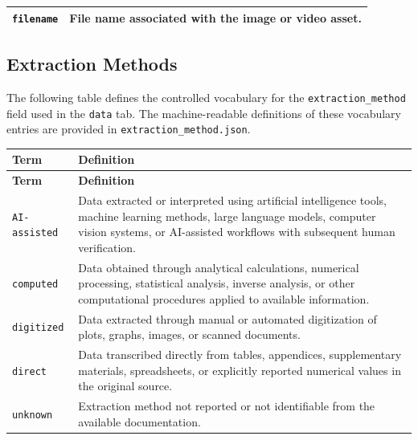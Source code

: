 \documentclass[11pt]{book}
\begin{document}
{\begin{longtable}{p{}p{}}
\texttt{filename} &
File name associated with the image or video asset. \\

\hline
\end{longtable}



\subsection{Extraction Methods}
\label{vocab:extraction_methods_list}

The following table defines the controlled vocabulary for the \texttt{extraction\_method} field used in the \texttt{data} tab. The machine-readable definitions of these vocabulary entries are provided in \texttt{extraction\_method.json}.

\begin{longtable}{p{}p{}}
\hline
\textbf{Term} & \textbf{Definition} \\
\hline
\endfirsthead

\hline
\textbf{Term} & \textbf{Definition} \\
\hline
\endhead

\texttt{AI-assisted} &
Data extracted or interpreted using artificial intelligence tools, machine learning methods, large language models, computer vision systems, or AI-assisted workflows with subsequent human verification. \\

\texttt{computed} &
Data obtained through analytical calculations, numerical processing, statistical analysis, inverse analysis, or other computational procedures applied to available information. \\

\texttt{digitized} &
Data extracted through manual or automated digitization of plots, graphs, images, or scanned documents. \\

\texttt{direct} &
Data transcribed directly from tables, appendices, supplementary materials, spreadsheets, or explicitly reported numerical values in the original source. \\

\texttt{unknown} &
Extraction method not reported or not identifiable from the available documentation. \\

\hline
\end{longtable}



}
\end{document}
